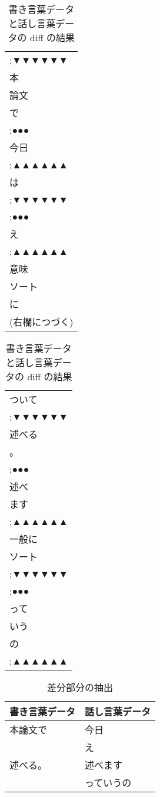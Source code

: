 \begin{table}[t]
  \begin{center}
    \leavevmode
    \caption{書き言葉データと話し言葉データの diff の結果}
    \label{tab:write_talk_diff}
\begin{tabular}{|l|}\hline
;▼▼▼▼▼▼\\
本\\
論文\\
で\\
;●●●\\
今日\\
;▲▲▲▲▲▲\\
は\\
;▼▼▼▼▼▼\\
;●●●\\
え\\
;▲▲▲▲▲▲\\
意味\\
ソート\\
に\\
(右欄につづく)\\\hline
\end{tabular}
\hspace{.5cm}
\begin{tabular}{|l|}\hline
ついて\\
;▼▼▼▼▼▼\\
述べる\\
。\\
;●●●\\
述べ\\
ます\\
;▲▲▲▲▲▲\\
一般に\\
ソート\\
;▼▼▼▼▼▼\\
;●●●\\
って\\
いう\\
の\\
;▲▲▲▲▲▲\\\hline
\end{tabular}
\end{center}
\end{table}

\begin{table}[t]
  \begin{center}
    \leavevmode
    \caption{差分部分の抽出}
    \label{tab:write_talk_diff_ext}
\begin{tabular}{|l|l|}\hline
\multicolumn{1}{|c|}{書き言葉データ} & \multicolumn{1}{|c|}{話し言葉データ}\\\hline
本論文で & 今日\\
         & え\\
述べる。 & 述べます\\
 & っていうの\\\hline
\end{tabular}
\end{center}
\end{table}

